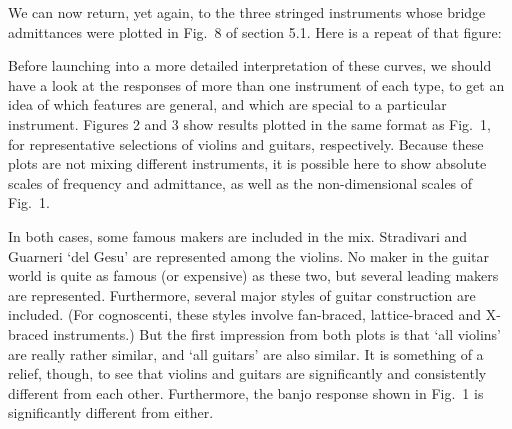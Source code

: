 

  We can now return, yet again, to the three stringed instruments whose bridge 
  admittances were plotted in Fig.\ 8 of section 5.1. Here is a repeat of that 
  figure: 


  Before launching into a more detailed interpretation of these curves, we 
  should have a look at the responses of more than one instrument of each type, 
  to get an idea of which features are general, and which are special to a 
  particular instrument. Figures 2 and 3 show results plotted in the same 
  format as Fig.\ 1, for representative selections of violins and guitars, 
  respectively. Because these plots are not mixing different instruments, it is 
  possible here to show absolute scales of frequency and admittance, as well as 
  the non-dimensional scales of Fig.\ 1. 



  In both cases, some famous makers are included in the mix. Stradivari and 
  Guarneri `del Gesu' are represented among the violins. No maker in the guitar 
  world is quite as famous (or expensive) as these two, but several leading 
  makers are represented. Furthermore, several major styles of guitar 
  construction are included. (For cognoscenti, these styles involve fan-braced, 
  lattice-braced and X-braced instruments.) But the first impression from both 
  plots is that `all violins' are really rather similar, and `all guitars' are 
  also similar. It is something of a relief, though, to see that violins and 
  guitars are significantly and consistently different from each other. 
  Furthermore, the banjo response shown in Fig.\ 1 is significantly different 
  from either. 

